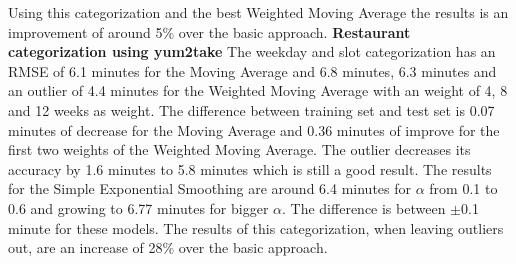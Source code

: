 Using this categorization and the best Weighted Moving Average the results is an improvement of around 5\% over the basic approach.
\newline\newline\textbf{Restaurant categorization using yum2take}\newline
The weekday and slot categorization has an RMSE of 6.1 minutes for the Moving Average and 6.8 minutes, 6.3 minutes and an outlier of 4.4 minutes for the Weighted Moving Average with an weight of 4, 8 and 12 weeks as weight. The difference between training set and test set is 0.07 minutes of decrease for the Moving Average and 0.36 minutes of improve for the first two weights of the Weighted Moving Average. The outlier decreases its accuracy by 1.6 minutes to 5.8 minutes which is still a good result. The results for the Simple Exponential Smoothing are around 6.4 minutes for $\alpha$ from 0.1 to 0.6 and growing to 6.77 minutes for bigger $\alpha$. The difference is between $\pm$0.1 minute for these models.\newline
The results of this categorization, when leaving outliers out, are an increase of 28\% over the basic approach.
